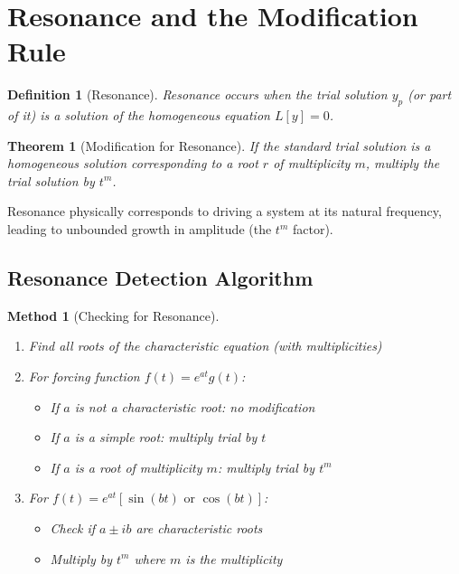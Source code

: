 \documentclass[12pt]{article}
\newtheorem{definition}{Definition}
\newtheorem{theorem}{Theorem}
\newtheorem{method}{Method}
\begin{document}
\section{Resonance and the Modification Rule}

\begin{definition}[Resonance]
Resonance occurs when the trial solution $y_p$ (or part of it) is a solution of the homogeneous equation $L[y] = 0$.
\end{definition}

\begin{theorem}[Modification for Resonance]
If the standard trial solution is a homogeneous solution corresponding to a root $r$ of multiplicity $m$, multiply the trial solution by $t^m$.
\end{theorem}

\begin{insight}
Resonance physically corresponds to driving a system at its natural frequency, leading to unbounded growth in amplitude (the $t^m$ factor).
\end{insight}

\subsection{Resonance Detection Algorithm}

\begin{method}[Checking for Resonance]
\begin{enumerate}
    \item Find all roots of the characteristic equation (with multiplicities)
    \item For forcing function $f(t) = e^{at}g(t)$:
    \begin{itemize}
        \item If $a$ is not a characteristic root: no modification
        \item If $a$ is a simple root: multiply trial by $t$
        \item If $a$ is a root of multiplicity $m$: multiply trial by $t^m$
    \end{itemize}
    \item For $f(t) = e^{at}[\sin(bt) \text{ or } \cos(bt)]$:
    \begin{itemize}
        \item Check if $a \pm ib$ are characteristic roots
        \item Multiply by $t^m$ where $m$ is the multiplicity
    \end{itemize}
\end{enumerate}
\end{method}
\end{document}
